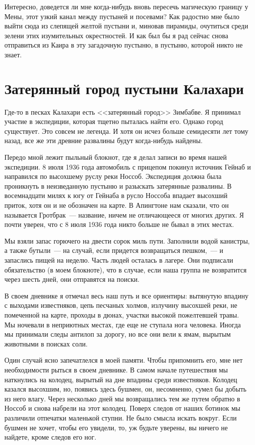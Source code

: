 \documentclass[12pt,a4paper,twoside,openany,svgnames]{memoir}
\begin{document}
Интересно, доведется ли мне когда-нибудь вновь пересечь магическую границу у Мены, этот узкий канал между пустыней и посевами? Как радостно мне было выйти сюда из слепящей желтой пустыни и, миновав пирамиды, очутиться среди зелени этих изумительных окрестностей. И как был бы я рад сейчас снова отправиться из Каира в эту загадочную пустыню, в пустыню, которой никто не знает.

\chapter{Затерянный город пустыни Калахари}

Где-то в песках Калахари есть <<затерянный город>> Зимбабве. Я принимал участие в экспедиции, которая тщетно пыталась найти его. Однако город существует. Это совсем не легенда. И хотя он исчез больше семидесяти лет тому назад, все же эти древние развалины будут когда-нибудь найдены.

Передо мной лежит пыльный блокнот, где я делал записи во время нашей экспедиции. 8 июля 1936 года автомобиль с прицепом покинул источник Гейнаб и направился по высохшему руслу реки Носсоб. Экспедиция должна была проникнуть в неизведанную пустыню и разыскать затерянные развалины. В восемнадцати милях к югу от Гейнаба в русло Носсоба впадает высохший приток, хотя он и не обозначен на карте. В Апингтоне нам сказали, что он называется Гротбрак~--- название, ничем не отличающееся от многих других. Я почти уверен, что с 8 июля 1936 года никто больше не бывал в этих местах.

Мы взяли запас горючего на двести сорок миль пути. Заполнили водой канистры, а также бутыли~--- на случай, если придется возвращаться пешком,~--- и запаслись пищей на неделю. Часть людей осталась в лагере. Они подписали обязательство (в моем блокноте), что в случае, если наша группа не возвратится через шесть дней, они отправятся на поиски.

В своем дневнике я отмечал весь наш путь и все ориентиры: вытянутую впадину с выходами известняков, цепь песчаных холмов, излучину высохшей реки, не помеченной на карте, проходы в дюнах, участки высокой пожелтевшей травы. Мы ночевали в неприютных местах, где еще не ступала нога человека. Иногда мы принимали следы антилоп за дорогу, но все они вели к ямам, вырытым животными в поисках соли.

Один случай ясно запечатлелся в моей памяти. Чтобы припомнить его, мне нет необходимости рыться в своем дневнике. В самом начале путешествия мы наткнулись на колодец, вырытый на дне впадины среди известняков. Колодец казался высохшим, но, появись здесь бушмен, он, несомненно, сумел бы добыть из него влагу. Через несколько дней мы возвращались тем же путем обратно в Носсоб и снова набрели на этот колодец. Поверх следов от наших ботинок мы различили отпечатки маленькой ступни. Не было смысла искать вокруг. Если бушмен не хочет, чтобы его увидели, то, уж будьте уверены, вы ничего не найдете, кроме следов его ног.
\end{document}
